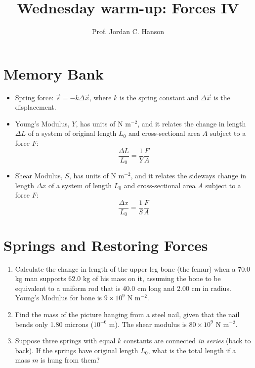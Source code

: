 \documentclass{article}
\begin{document}
\twocolumn

\title{Wednesday warm-up: Forces IV}
\author{Prof. Jordan C. Hanson}

\maketitle

\section{Memory Bank}

\begin{itemize}
\item Spring force: $\vec{s} = -k \Delta \vec{x}$, where $k$ is the spring constant and $\Delta\vec{x}$ is the displacement.
\item Young's Modulus, $Y$, has units of N m$^{-2}$, and it relates the change in length $\Delta L$ of a system of original length $L_0$ and cross-sectional area $A$ subject to a force $F$:
\begin{equation}
\frac{\Delta L}{L_0} = \frac{1}{Y} \frac{F}{A}
\end{equation}
\item Shear Modulus, $S$, has units of N m$^{-2}$, and it relates the sideways change in length $\Delta x$ of a system of length $L_0$ and cross-sectional area $A$ subject to a force $F$:
\begin{equation}
\frac{\Delta x}{L_0} = \frac{1}{S} \frac{F}{A}
\end{equation}
\end{itemize}

\section{Springs and Restoring Forces}

\begin{enumerate}
\item Calculate the change in length of the upper leg bone (the femur) when a 70.0 kg man supports 62.0 kg of his mass on it, assuming the bone to be equivalent to a uniform rod that is 40.0 cm long and 2.00 cm in radius. Young's Modulus for bone is $9 \times 10^9$ N m$^{-2}$. \\ \vspace{3cm}
\item Find the mass of the picture hanging from a steel nail, given that the nail bends only 1.80 microns ($10^{-6}$ m).  The shear modulus is $80 \times 10^9$ N m$^{-2}$. \\ \vspace{3cm}
\item Suppose three springs with equal $k$ constants are connected \textit{in series} (back to back).  If the springs have original length $L_0$, what is the total length if a mass $m$ is hung from them?
\end{enumerate}
\end{document}
